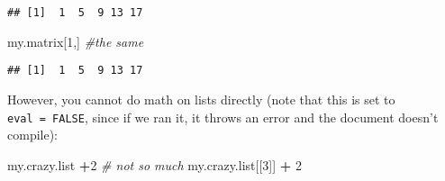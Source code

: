 \documentclass[]{article}
\newenvironment{Shaded}{\begin{snugshade}}{\end{snugshade}}
\newcommand{\DecValTok}[1]{\textcolor[rgb]{0.00,0.00,0.81}{#1}}
\newcommand{\StringTok}[1]{\textcolor[rgb]{0.31,0.60,0.02}{#1}}
\newcommand{\CommentTok}[1]{\textcolor[rgb]{0.56,0.35,0.01}{\textit{#1}}}
\newcommand{\OperatorTok}[1]{\textcolor[rgb]{0.81,0.36,0.00}{\textbf{#1}}}
\newcommand{\NormalTok}[1]{#1}
\begin{document}
\begin{verbatim}
## [1]  1  5  9 13 17
\end{verbatim}

\begin{Shaded}
\begin{Highlighting}[]
\NormalTok{my.matrix[}\DecValTok{1}\NormalTok{,]  }\CommentTok{#the same}
\end{Highlighting}
\end{Shaded}

\begin{verbatim}
## [1]  1  5  9 13 17
\end{verbatim}

However, you cannot do math on lists directly (note that this is set to
\texttt{eval\ =\ FALSE}, since if we ran it, it throws an error and the
document doesn't compile):

\begin{Shaded}
\begin{Highlighting}[]
\NormalTok{my.crazy.list }\OperatorTok{+}\DecValTok{2} \CommentTok{# not so much}
\NormalTok{my.crazy.list[[}\DecValTok{3}\NormalTok{]] }\OperatorTok{+}\StringTok{ }\DecValTok{2}
\end{Highlighting}
\end{Shaded}
\end{document}
